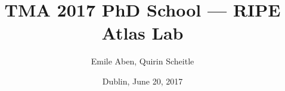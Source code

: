 %
% 
% 
%

\usepackage{soul}
\renewcommand{\PersonTitel}{}
\newcommand{\Datum}{\today}

\renewcommand{\PraesentationFusszeileZusatz}{TMA'17 RIPE Atlas Lab}

\title{TMA 2017 PhD School --- RIPE Atlas Lab}
\author{Emile Aben, Quirin Scheitle}
\institute[]{\UniversitaetName \\ \FakultaetName}
\date[\Datum]{Dublin, June 20, 2017}
\subject{}
\usepackage{tikz}


\usepackage{xspace}
\usepackage{tikz}
\usepackage{booktabs}

\usepackage{hyperref,xcolor,color,colortbl,graphicx,tabularx}
\usepackage{pgfplots}
\usepackage{multirow}
\usepackage{xspace}
\usepackage{environ}
\usepackage{comment}
\usepackage{subcaption}
\usepackage{subfloat}
\usepackage{textgreek}  %
\usepackage{soul} %




\newcommand{\packet}[3]{
	\draw[-latex,line width=0.7pt] (#1) to node[above,sloped]{\scriptsize{{#3}}} (#2);}

\newcommand{\dpacket}[3]{
	\draw[latex-latex,line width=0.7pt] (#1) to node[above,sloped]{\scriptsize{{#3}}} (#2);}

\usepackage{tumcolor}




